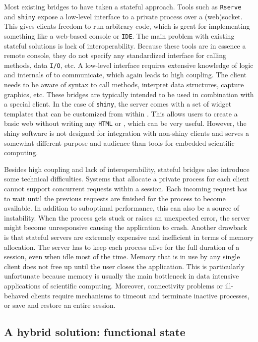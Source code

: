 Most existing bridges to \R have taken a stateful approach. Tools such as \texttt{Rserve} \citep{urbanek2013rserve} and \texttt{shiny} \citep{shiny} expose a low-level interface to a private \R process over a (web)socket. This gives clients freedom to run arbitrary \R code, which is great for implementing something like a web-based console or \texttt{IDE}. The main problem with existing stateful solutions is lack of interoperability. Because these tools are in essence a remote \R console, they do not specify any standardized interface for calling methods, data \texttt{I/O}, etc. A low-level interface requires extensive knowledge of logic and internals of \R to communicate, which again leads to high coupling. The client needs to be aware of \R syntax to call \R methods, interpret \R data structures, capture graphics, etc. These bridges are typically intended to be used in combination with a special client. In the case of  \texttt{shiny}, the server comes with a set of widget templates that can be customized from within \R. This allows \R users to create a basic web \GUI without writing any \texttt{HTML} or \JavaScript, which can be very useful. However, the shiny software is not designed for integration with non-shiny clients and serves a somewhat different purpose and audience than tools for embedded scientific computing.

Besides high coupling and lack of interoperability, stateful bridges also introduce some technical difficulties. Systems that allocate a private \R process for each client cannot support concurrent requests within a session. Each incoming request has to wait until the previous requests are finished for the process to become available. In addition to suboptimal performance, this can also be a source of instability. When the \R process gets stuck or raises an unexpected error, the server might become unresponsive causing the application to crash. Another drawback is that stateful servers are extremely expensive and inefficient in terms of memory allocation. The server has to keep each \R process alive for the full duration of a session, even when idle most of the time. Memory that is in use by any single client does not free up until the user closes the application. This is particularly unfortunate because memory is usually the main bottleneck in data intensive applications of scientific computing. Moreover, connectivity problems or ill-behaved clients require mechanisms to timeout and terminate inactive processes, or save and restore an entire session.

\subsection{A hybrid solution: functional state}

